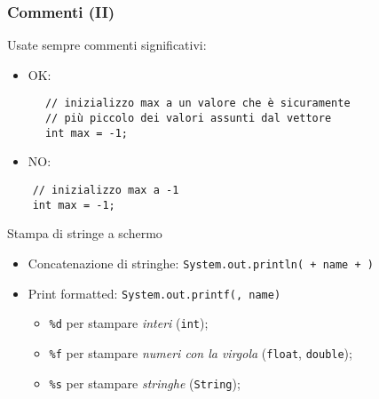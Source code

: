 \begin{frame}[fragile]\frametitle{Commenti (II)}

  Usate sempre commenti significativi:
  \begin{itemize}
   \item {\color{green} OK}:
  \end{itemize}
  \begin{center}
    \begin{minipage}[c]{11cm}
      {\color{green!50!black}
	\begin{verbatim}
	  // inizializzo max a un valore che è sicuramente
	  // più piccolo dei valori assunti dal vettore
	  int max = -1;
	\end{verbatim} 
      }
    \end{minipage}  
  \end{center}

  \begin{itemize}
   \item {\color{red} NO}:
  \end{itemize}
  {\color{red!80!black}
  \begin{center}
    \begin{minipage}[c]{11cm}
      \begin{verbatim}
	// inizializzo max a -1
	int max = -1;
      \end{verbatim}
    \end{minipage}  
  \end{center}
  }

\end{frame}

\begin{frame}{Stampa di stringe a schermo}
  \begin{itemize}
    \item Concatenazione di stringhe: \newline
	  \texttt{System.out.println( + name + )}
    \item Print formatted: \newline
	  \texttt{System.out.printf(, name)}
      \begin{itemize}
	\item \texttt{\%d} per stampare \emph{interi} (\texttt{int});
	\item \texttt{\%f} per stampare \emph{numeri con la virgola} (\texttt{float}, \texttt{double});
	\item \texttt{\%s} per stampare \emph{stringhe} (\texttt{String});
      \end{itemize}
  \end{itemize}
 
\end{frame}
